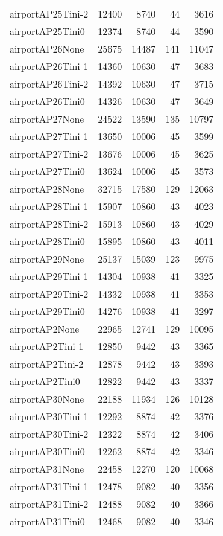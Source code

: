 \begin{longtable}{lrrrr}
airportAP25Tini-2 & 12400 & 8740 & 44 & 3616 \\
airportAP25Tini0 & 12374 & 8740 & 44 & 3590 \\
airportAP26None & 25675 & 14487 & 141 & 11047 \\
airportAP26Tini-1 & 14360 & 10630 & 47 & 3683 \\
airportAP26Tini-2 & 14392 & 10630 & 47 & 3715 \\
airportAP26Tini0 & 14326 & 10630 & 47 & 3649 \\
airportAP27None & 24522 & 13590 & 135 & 10797 \\
airportAP27Tini-1 & 13650 & 10006 & 45 & 3599 \\
airportAP27Tini-2 & 13676 & 10006 & 45 & 3625 \\
airportAP27Tini0 & 13624 & 10006 & 45 & 3573 \\
airportAP28None & 32715 & 17580 & 129 & 12063 \\
airportAP28Tini-1 & 15907 & 10860 & 43 & 4023 \\
airportAP28Tini-2 & 15913 & 10860 & 43 & 4029 \\
airportAP28Tini0 & 15895 & 10860 & 43 & 4011 \\
airportAP29None & 25137 & 15039 & 123 & 9975 \\
airportAP29Tini-1 & 14304 & 10938 & 41 & 3325 \\
airportAP29Tini-2 & 14332 & 10938 & 41 & 3353 \\
airportAP29Tini0 & 14276 & 10938 & 41 & 3297 \\
airportAP2None & 22965 & 12741 & 129 & 10095 \\
airportAP2Tini-1 & 12850 & 9442 & 43 & 3365 \\
airportAP2Tini-2 & 12878 & 9442 & 43 & 3393 \\
airportAP2Tini0 & 12822 & 9442 & 43 & 3337 \\
airportAP30None & 22188 & 11934 & 126 & 10128 \\
airportAP30Tini-1 & 12292 & 8874 & 42 & 3376 \\
airportAP30Tini-2 & 12322 & 8874 & 42 & 3406 \\
airportAP30Tini0 & 12262 & 8874 & 42 & 3346 \\
airportAP31None & 22458 & 12270 & 120 & 10068 \\
airportAP31Tini-1 & 12478 & 9082 & 40 & 3356 \\
airportAP31Tini-2 & 12488 & 9082 & 40 & 3366 \\
airportAP31Tini0 & 12468 & 9082 & 40 & 3346 \\

\end{longtable}
